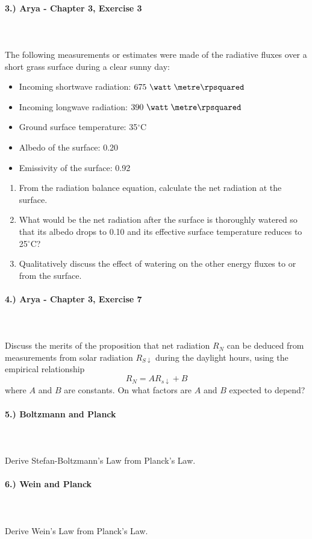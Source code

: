 \documentclass[11pt]{article}
\begin{document}
\paragraph{3.) Arya - Chapter 3, Exercise 3}~\\\\
The following measurements or estimates were made of the radiative fluxes over a short grass surface during a clear sunny day:
\vspace{-10pt}
\begin{itemize}
	\item Incoming shortwave radiation: $675\ \watt\; \metre\rpsquared$
	\item Incoming longwave radiation: $390\ \watt\; \metre\rpsquared$
	\item Ground surface temperature: 35$^\circ$C
	\item Albedo of the surface: 0.20
	\item Emissivity of the surface: 0.92
\end{itemize}
\begin{enumerate}[label=(\alph*),topsep=-10pt]
	\item From the radiation balance equation, calculate the net radiation at the surface.
	\item What would be the net radiation after the surface is thoroughly watered so that its albedo drops to 0.10 and its effective surface temperature reduces to 25$^\circ$C?
	\item Qualitatively discuss the effect of watering on the other energy fluxes to or from the surface.
\end{enumerate}

\paragraph{4.) Arya - Chapter 3, Exercise 7}~\\\\
Discuss the merits of the proposition that net radiation $R_N$ can be deduced from measurements from solar radiation $R_{S\downarrow}$ during the daylight hours, using the empirical relationship $$R_N = AR_{s\downarrow} + B$$ where $A$ and $B$ are constants. On what factors are $A$ and $B$ expected to depend?

\paragraph{5.) Boltzmann and Planck}~\\\\
Derive Stefan-Boltzmann's Law from Planck's Law.

\paragraph{6.) Wein and Planck}~\\\\
Derive Wein's Law from Planck's Law.
\end{document}
